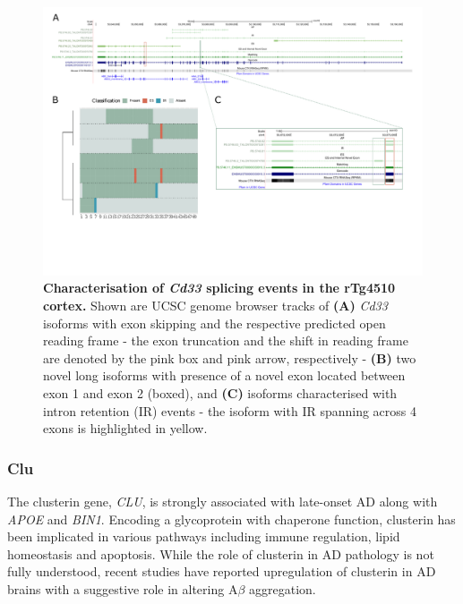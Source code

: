 \begin{landscape}
	\begin{figure}[htp]
		\centering
		\captionsetup{width=1.3\textwidth}
		\includegraphics[page=5,trim={0 3.5cm 0 0},scale = 0.85]{Figures/TargetGenes_Annotation_Landscape.pdf}
		\caption[Characterisation of the \textit{Cd33} splicing landscape]%
		{\textbf{Characterisation of \textit{Cd33} splicing events in the rTg4510 cortex.} Shown are UCSC genome browser tracks of \textbf{(A)} \textit{Cd33} isoforms with exon skipping and the respective predicted open reading frame - the exon truncation and the shift in reading frame are denoted by the pink box and pink arrow, respectively - \textbf{(B)} two novel long isoforms with presence of a novel exon located between exon 1 and exon 2 (boxed), and \textbf{(C)} isoforms characterised with intron retention (IR) events - the isoform with IR spanning across 4 exons is highlighted in yellow.}    
		\label{fig:cd33_orf}
	\end{figure}
\end{landscape}
\restoregeometry 

\newpage
\subsubsection{Clu}
The clusterin gene, \textit{CLU}, is strongly associated with late-onset AD along with \textit{APOE} and \textit{BIN1}\cite{Lambert2019}. Encoding a glycoprotein with chaperone function, clusterin has been implicated in various pathways including immune regulation, lipid homeostasis and apoptosis\cite{Foster2019}. While the role of clusterin in AD pathology is not fully understood, recent studies have reported upregulation of clusterin in AD brains with a suggestive role in altering A$\beta$ aggregation\cite{Jackson2019}. 

